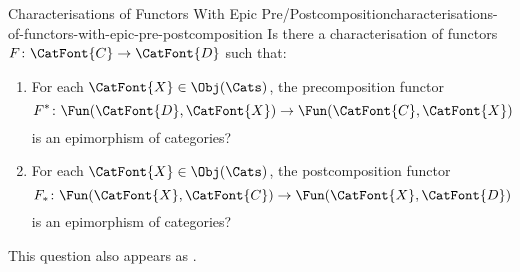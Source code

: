 \begin{question}{Characterisations of Functors With Epic Pre/Postcomposition}{characterisations-of-functors-with-epic-pre-postcomposition}%
    Is there a characterisation of functors $F\colon\CatFont{C}\to\CatFont{D}$ such that:
    \begin{enumerate}
        \item\label{characterisations-of-functors-with-epic-pre-postcomposition-a}For each $\CatFont{X}\in\Obj(\Cats)$, the precomposition functor
            \[
                F^{*}%
                \colon%
                \Fun(\CatFont{D},\CatFont{X})%
                \to%
                \Fun(\CatFont{C},\CatFont{X})%
            \]%
            is an epimorphism of categories?
        \item\label{characterisations-of-functors-with-epic-pre-postcomposition-b}For each $\CatFont{X}\in\Obj(\Cats)$, the postcomposition functor
            \[
                F_{*}%
                \colon%
                \Fun(\CatFont{X},\CatFont{C})%
                \to%
                \Fun(\CatFont{X},\CatFont{D})%
            \]%
            is an epimorphism of categories?
    \end{enumerate}
    This question also appears as \cite{MO468125}.
\end{question}

